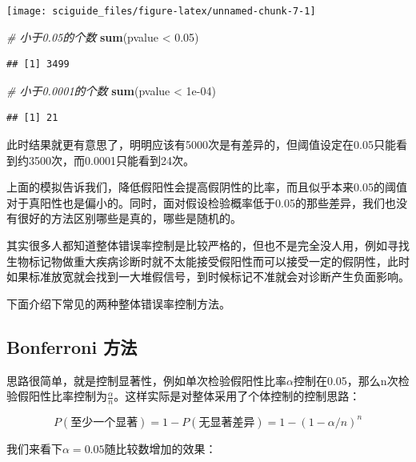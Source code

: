 \documentclass[]{tufte-book}
\newenvironment{Shaded}{}{}
\newcommand{\CommentTok}[1]{\textcolor[rgb]{0.38,0.63,0.69}{\textit{#1}}}
\newcommand{\FloatTok}[1]{\textcolor[rgb]{0.25,0.63,0.44}{#1}}
\newcommand{\KeywordTok}[1]{\textcolor[rgb]{0.00,0.44,0.13}{\textbf{#1}}}
\newcommand{\NormalTok}[1]{#1}
\newcommand{\OperatorTok}[1]{\textcolor[rgb]{0.40,0.40,0.40}{#1}}
\newcommand{\StringTok}[1]{\textcolor[rgb]{0.25,0.44,0.63}{#1}}
\begin{document}
\texttt{[image: sciguide\_files/figure-latex/unnamed-chunk-7-1]}

\begin{Shaded}
\begin{Highlighting}[]
\CommentTok{# 小于0.05的个数}
\KeywordTok{sum}\NormalTok{(pvalue }\OperatorTok{<}\StringTok{ }\FloatTok{0.05}\NormalTok{)}
\end{Highlighting}
\end{Shaded}

\begin{verbatim}
## [1] 3499
\end{verbatim}

\begin{Shaded}
\begin{Highlighting}[]
\CommentTok{# 小于0.0001的个数}
\KeywordTok{sum}\NormalTok{(pvalue }\OperatorTok{<}\StringTok{ }\FloatTok{1e-04}\NormalTok{)}
\end{Highlighting}
\end{Shaded}

\begin{verbatim}
## [1] 21
\end{verbatim}

此时结果就更有意思了，明明应该有5000次是有差异的，但阈值设定在0.05只能看到约3500次，而0.0001只能看到24次。

上面的模拟告诉我们，降低假阳性会提高假阴性的比率，而且似乎本来0.05的阈值对于真阳性也是偏小的。同时，面对假设检验概率低于0.05的那些差异，我们也没有很好的方法区别哪些是真的，哪些是随机的。

其实很多人都知道整体错误率控制是比较严格的，但也不是完全没人用，例如寻找生物标记物做重大疾病诊断时就不太能接受假阳性而可以接受一定的假阴性，此时如果标准放宽就会找到一大堆假信号，到时候标记不准就会对诊断产生负面影响。

下面介绍下常见的两种整体错误率控制方法。

\hypertarget{bonferroni-ux65b9ux6cd5}{%
\subsection{Bonferroni 方法}\label{bonferroni-ux65b9ux6cd5}}

思路很简单，就是控制显著性，例如单次检验假阳性比率\(\alpha\)控制在0.05，那么n次检验假阳性比率控制为\(\frac{\alpha}{n}\)。这样实际是对整体采用了个体控制的控制思路：

\[
P(至少一个显著)=1-P(无显著差异) = 1-(1-\alpha/n)^n
\]

我们来看下\(\alpha = 0.05\)随比较数增加的效果：
\end{document}
